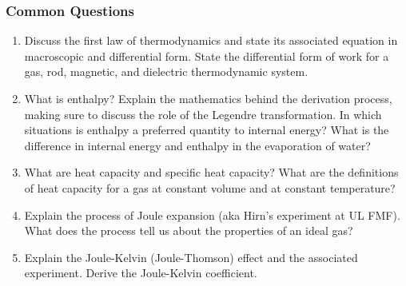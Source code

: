 \documentclass[11pt, a4paper]{article}
\begin{document}
\subsubsection{Common Questions}
\begin{enumerate}
    \item Discuss the first law of thermodynamics and state its associated equation in macroscopic and differential form. State the differential form of work for a gas, rod, magnetic, and dielectric thermodynamic system.

    \item What is enthalpy? Explain the mathematics behind the derivation process, making sure to discuss the role of the Legendre transformation. In which situations is enthalpy a preferred quantity to internal energy? What is the difference in internal energy and enthalpy in the evaporation of water?

    \item What are heat capacity and specific heat capacity? What are the definitions of heat capacity for a gas at constant volume and at constant temperature?

    \item Explain the process of Joule expansion (aka Hirn's experiment at UL FMF). What does the process tell us about the properties of an ideal gas?

    \item Explain the Joule-Kelvin (Joule-Thomson) effect and the associated experiment. Derive the Joule-Kelvin coefficient.
\end{enumerate}
\end{document}
